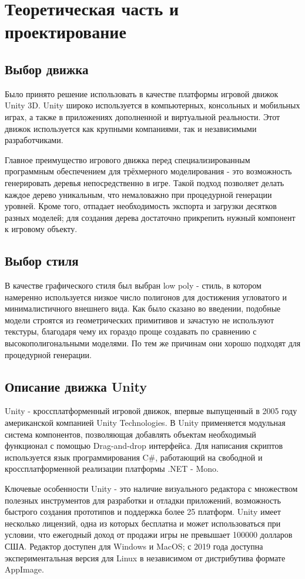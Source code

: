 \chapter{Теоретическая часть и проектирование}
\section{Выбор движка}
Было принято решение использовать в качестве платформы игровой движок Unity 3D. Unity широко используется в компьютерных, консольных и мобильных играх, а также в приложениях дополненной и виртуальной реальности. Этот движок используется как крупными компаниями, так и независимыми разработчиками.

Главное преимущество игрового движка перед специализированным программным обеспечением для трёхмерного моделирования - это возможность генерировать деревья непосредственно в игре. Такой подход позволяет делать каждое дерево уникальным, что немаловажно при процедурной генерации уровней. Кроме того, отпадает необходимость экспорта и загрузки десятков разных моделей; для создания дерева достаточно прикрепить нужный компонент к игровому объекту. 

\section{Выбор стиля}
В качестве графического стиля был выбран low poly - стиль, в котором намеренно используется низкое число полигонов для достижения угловатого и минималистичного внешнего вида. Как было сказано во введении, подобные модели строятся из геометрических примитивов и зачастую не используют текстуры, благодаря чему их гораздо проще создавать по сравнению с высокополигональными моделями. По тем же причинам они хорошо подходят для процедурной генерации. 

\section{Описание движка Unity}
Unity - кроссплатформенный игровой движок, впервые выпущенный в 2005 году американской компанией Unity Technologies. В Unity применяется модульная система компонентов, позволяющая добавлять объектам необходимый функционал с помощью Drag-and-drop интерфейса. Для написания скриптов используется язык программирования C\#, работающий на свободной и кроссплатформенной реализации платформы .NET - Mono.

Ключевые особенности Unity - это наличие визуального редактора с множеством полезных инструментов для разработки и отладки приложений, возможность быстрого создания прототипов и поддержка более 25 платформ. Unity имеет несколько лицензий, одна из которых бесплатна и может использоваться при условии, что ежегодный доход от продажи игры не превышает 100000 долларов США. Редактор доступен для Windows и MacOS; с 2019 года доступна экспериментальная версия для Linux в независимом от дистрибутива формате AppImage.

